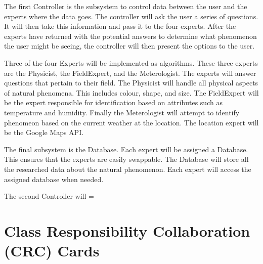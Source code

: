 \documentclass[]{article}
\begin{document}
The first Controller is the subsystem to control data between the user and the experts  where the data goes. The controller will ask the user a series of questions. It will then take this information and pass it to the four experts. After the experts have returned with the potential answers to determine what phenomenon the user might be seeing, the controller will then present the options to the user. 

Three of the four Experts will be implemented as algorithms. These three experts are the Physicist, the FieldExpert, and the Meterologist. The experts will answer questions that pertain to their field. The Physicist will handle all physical aspects of natural phenomena. This includes colour, shape, and size. The FieldExpert will be the expert responsible for identification based on attributes such as temperature and humidity. Finally the Meterologist will attempt to identify phenomeon based on the current weather at the location. The location expert will be the Google Maps API.

The final subsystem is the Database. Each expert will be assigned a Database. This ensures that the experts are easily swappable. The Database will store all the researched data about the natural phenomenon. Each expert will access the assigned database when needed. 

The second Controller will 
=

	
\section{Class Responsibility Collaboration (CRC) Cards}
\label{sec:class_responsibility_collaboration_crc_cards}
\end{document}
